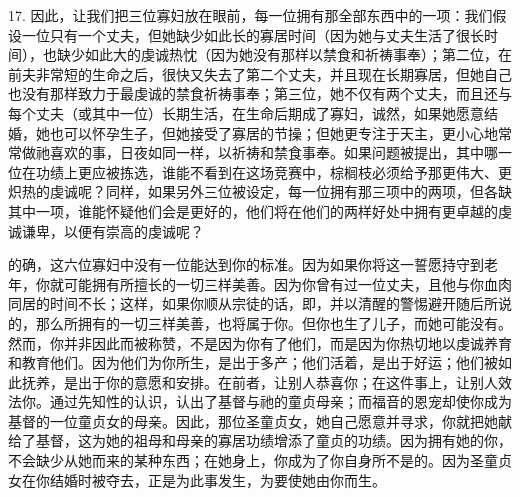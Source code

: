 17. 因此，让我们把三位寡妇放在眼前，每一位拥有那全部东西中的一项：我们假设一位只有一个丈夫，但她缺少如此长的寡居时间（因为她与丈夫生活了很长时间），也缺少如此大的虔诚热忱（因为她没有那样以禁食和祈祷事奉）；第二位，在前夫非常短的生命之后，很快又失去了第二个丈夫，并且现在长期寡居，但她自己也没有那样致力于最虔诚的禁食祈祷事奉；第三位，她不仅有两个丈夫，而且还与每个丈夫（或其中一位）长期生活，在生命后期成了寡妇，诚然，如果她愿意结婚，她也可以怀孕生子，但她接受了寡居的节操；但她更专注于天主，更小心地常常做祂喜欢的事，日夜如同一样，以祈祷和禁食事奉。如果问题被提出，其中哪一位在功绩上更应被拣选，谁能不看到在这场竞赛中，棕榈枝必须给予那更伟大、更炽热的虔诚呢？同样，如果另外三位被设定，每一位拥有那三项中的两项，但各缺其中一项，谁能怀疑他们会是更好的，他们将在他们的两样好处中拥有更卓越的虔诚谦卑，以便有崇高的虔诚呢？\par

的确，这六位寡妇中没有一位能达到你的标准。因为如果你将这一誓愿持守到老年，你就可能拥有所擅长的一切三样美善。因为你曾有过一位丈夫，且他与你血肉同居的时间不长；这样，如果你顺从宗徒的话，即，并以清醒的警惕避开随后所说的，那么所拥有的一切三样美善，也将属于你。但你也生了儿子，而她可能没有。然而，你并非因此而被称赞，不是因为你有了他们，而是因为你热切地以虔诚养育和教育他们。因为他们为你所生，是出于多产；他们活着，是出于好运；他们被如此抚养，是出于你的意愿和安排。在前者，让别人恭喜你；在这件事上，让别人效法你。通过先知性的认识，认出了基督与祂的童贞母亲；而福音的恩宠却使你成为基督的一位童贞女的母亲。因此，那位圣童贞女，她自己愿意并寻求，你就把她献给了基督，这为她的祖母和母亲的寡居功绩增添了童贞的功绩。因为拥有她的你，不会缺少从她而来的某种东西；在她身上，你成为了你自身所不是的。因为圣童贞女在你结婚时被夺去，正是为此事发生，为要使她由你而生。\par


